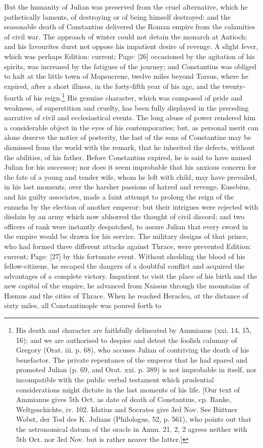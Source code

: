 But the humanity of Julian was preserved from the cruel alternative, which he pathetically laments, of destroying or of being himself destroyed: and the seasonable death of Constantius delivered the Roman empire from the calamities of civil war. The approach of winter could not detain the monarch at Antioch; and his favourites durst not oppose his impatient desire of revenge. A slight fever, which was perhaps Edition: current; Page: [26] occasioned by the agitation of his spirits, was increased by the fatigues of the journey; and Constantius was obliged to halt at the little town of Mopsucrene, twelve miles beyond Tarsus, where he expired, after a short illness, in the forty-fifth year of his age, and the twenty-fourth of his reign.\footnote{His death and character are faithfully delineated by Ammianus (xxi. 14, 15, 16); and we are authorised to despise and detest the foolish calumny of Gregory (Orat. iii. p. 68), who accuses Julian of contriving the death of his benefactor. The private repentance of the emperor that he had spared and promoted Julian (p. 69, and Orat. xxi. p. 389) is not improbable in itself, nor incompatible with the public verbal testament which prudential considerations might dictate in the last moments of his life. [Our text of Ammianus gives 5th Oct. as date of death of Constantius, cp. Ranke, Weltgeschichte, iv. 102. Idatius and Socrates give 3rd Nov. See Büttner Wobst, der Tod des K. Julians (Philologus, 52, p. 561), who points out that the astronomical datum of the oracle in Amm. 21, 2, 2 agrees neither with 5th Oct. nor 3rd Nov. but is rather nearer the latter.]} His genuine character, which was composed of pride and weakness, of superstition and cruelty, has been fully displayed in the preceding narrative of civil and ecclesiastical events. The long abuse of power rendered him a considerable object in the eyes of his contemporaries; but, as personal merit can alone deserve the notice of posterity, the last of the sons of Constantine may be dismissed from the world with the remark, that he inherited the defects, without the abilities, of his father. Before Constantius expired, he is said to have named Julian for his successor; nor does it seem improbable that his anxious concern for the fate of a young and tender wife, whom he left with child, may have prevailed, in his last moments, over the harsher passions of hatred and revenge. Eusebius, and his guilty associates, made a faint attempt to prolong the reign of the eunuchs by the election of another emperor: but their intrigues were rejected with disdain by an army which now abhorred the thought of civil discord; and two officers of rank were instantly despatched, to assure Julian that every sword in the empire would be drawn for his service. The military designs of that prince, who had formed three different attacks against Thrace, were prevented Edition: current; Page: [27] by this fortunate event. Without shedding the blood of his fellow-citizens, he escaped the dangers of a doubtful conflict and acquired the advantages of a complete victory. Impatient to visit the place of his birth and the new capital of the empire, he advanced from Naissus through the mountains of Hæmus and the cities of Thrace. When he reached Heraclea, at the distance of sixty miles, all Constantinople was poured forth to 